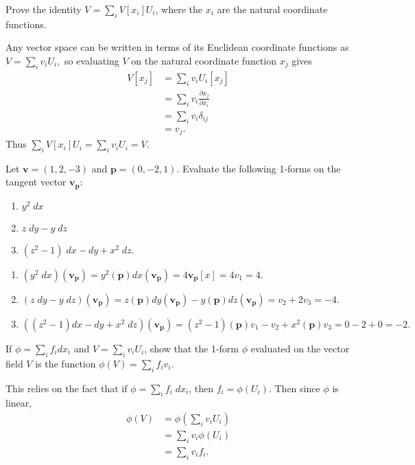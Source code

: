 \documentclass[10pt]{report}
\begin{document}
\begin{exer}[1.3.4]
	Prove the identity $V=\sum_i V[x_i] U_i$, where the $x_i$ are the natural coordinate functions.
\end{exer}
Any vector space can be written in terms of its Euclidean coordinate functions as $V = \sum_i v_i U_i,$ so evaluating $V$ on the natural coordinate function $x_j$ gives
\begin{align*}
	V[x_j] &= \sum_i v_i U_i[x_j] \\
	       &= \sum_i v_i \frac{\partial x_j}{\partial x_i} \\
	       &= \sum_i v_i \delta_{ij} \\
	       &= v_j.
\end{align*}
Thus $\sum_i V[x_i] U_i = \sum_i v_i U_i = V$.

\begin{exer}[1.5.1]
	Let $\mathbf{v}=(1,2,-3)$ and $\mathbf{p}=(0, -2, 1).$ Evaluate the following 1-forms on the tangent vector $\mathbf{v}_{\mathbf{p}}$:
	\begin{enumerate}
		\item $y^2\;dx$
		\item $z\;dy - y\;dz$ 
		\item $(z^2-1)\;dx - dy + x^2\;dz.$
	\end{enumerate}
\end{exer}
\begin{enumerate}
	\item $(y^2\;dx)(\mathbf{v}_{\mathbf{p}}) = y^2(\mathbf{p})dx(\mathbf{v}_{\mathbf{p}})=4\mathbf{v}_{\mathbf{p}}[x] = 4v_1=4.$ 
	\item $(z\;dy - y\;dz)(\mathbf{v}_{\mathbf{p}}) = z(\mathbf{p})dy(\mathbf{v}_{\mathbf{p}}) - y(\mathbf{p})dz(\mathbf{v}_{\mathbf{p}})=v_2+2v_3=-4$.
	\item $( (z^2-1)dx-dy+x^2\;dz)(\mathbf{v}_{\mathbf{p}})=(z^2-1)(\mathbf{p})v_1-v_2+x^2(\mathbf{p})v_3 = 0 - 2 + 0 = -2.$
\end{enumerate}

\begin{exer}[1.5.2]
	If $\phi=\sum_i f_i dx_i$ and $V=\sum_i v_i U_i$, show that the 1-form $\phi$ evaluated on the vector field $V$ is the function $\phi(V)=\sum_i f_i v_i$.
\end{exer}
This relies on the fact that if $\phi=\sum_i f_i \;dx_i$, then $f_i = \phi(U_i)$. Then since $\phi$ is linear,
\begin{align*}
	\phi(V) &= \phi\left( \sum_i v_i U_i \right) \\
		&= \sum_i v_i \phi(U_i) \\
		&= \sum_i v_i f_i.
\end{align*}
\end{document}
